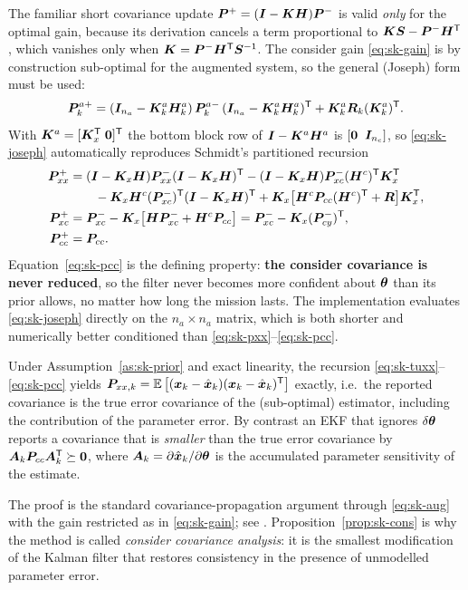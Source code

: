 \begin{remark}\label{rem:sk-joseph}
The familiar short covariance update $\bm{P}^+=(\bm{I}-\bm{K}\bm{H})\bm{P}^-$ is valid \emph{only} for the
optimal gain, because its derivation cancels a term proportional to
$\bm{K}\bm{S} - \bm{P}^-\bm{H}^{\mathsf{T}}$, which vanishes only when $\bm{K}=\bm{P}^-\bm{H}^{\mathsf{T}}\bm{S}^{-1}$.  The consider gain
\eqref{eq:sk-gain} is by construction sub-optimal for the augmented system, so the general
(Joseph) form \cite{bucyjoseph1968} must be used:
\begin{equation}
\bm{P}^{a+}_k = (\bm{I}_{n_a}-\bm{K}^a_k\bm{H}^a_k)\,\bm{P}^{a-}_k\,(\bm{I}_{n_a}-\bm{K}^a_k\bm{H}^a_k)^{\mathsf{T}}
            + \bm{K}^a_k\bm{R}_k(\bm{K}^a_k)^{\mathsf{T}} .
\label{eq:sk-joseph}
\end{equation}
With $\bm{K}^a=[\bm{K}_x^{\mathsf{T}}\;\bm 0]^{\mathsf{T}}$ the bottom block row of $\bm{I}-\bm{K}^a\bm{H}^a$ is
$[\bm 0\;\;\bm{I}_{n_c}]$, so \eqref{eq:sk-joseph} automatically reproduces Schmidt's
partitioned recursion
\begin{align}
\bm{P}^+_{xx} &= (\bm{I}-\bm{K}_x\bm{H})\bm{P}^-_{xx}(\bm{I}-\bm{K}_x\bm{H})^{\mathsf{T}}
   - (\bm{I}-\bm{K}_x\bm{H})\bm{P}^-_{xc}(\bm{H}^c)^{\mathsf{T}}\bm{K}_x^{\mathsf{T}} \nonumber\\
   &\qquad - \bm{K}_x\bm{H}^c(\bm{P}^-_{xc})^{\mathsf{T}}(\bm{I}-\bm{K}_x\bm{H})^{\mathsf{T}}
   + \bm{K}_x\!\left[\bm{H}^c\bm{P}_{cc}(\bm{H}^c)^{\mathsf{T}}+\bm{R}\right]\!\bm{K}_x^{\mathsf{T}}, \label{eq:sk-pxx}\\
\bm{P}^+_{xc} &= \bm{P}^-_{xc} - \bm{K}_x\!\left[\bm{H}\bm{P}^-_{xc} + \bm{H}^c\bm{P}_{cc}\right]
            = \bm{P}^-_{xc} - \bm{K}_x (\bm{P}^-_{cy})^{\mathsf{T}}, \label{eq:sk-pxc}\\
\bm{P}^+_{cc} &= \bm{P}_{cc}. \label{eq:sk-pcc}
\end{align}
Equation~\eqref{eq:sk-pcc} is the defining property: \textbf{the consider covariance is never
reduced}, so the filter never becomes more confident about $\bm{\theta}$ than its prior allows, no
matter how long the mission lasts.  The implementation evaluates \eqref{eq:sk-joseph} directly on
the $n_a\times n_a$ matrix, which is both shorter and numerically better conditioned than
\eqref{eq:sk-pxx}--\eqref{eq:sk-pcc}.
\end{remark}

\begin{proposition}[Consistency]\label{prop:sk-cons}
Under Assumption~\ref{as:sk-prior} and exact linearity, the recursion
\eqref{eq:sk-tuxx}--\eqref{eq:sk-pcc} yields
$\bm{P}_{xx,k} = \mathbb{E}\left[(\bm{x}_k-\hat{\bm{x}}_k)(\bm{x}_k-\hat{\bm{x}}_k)^{\mathsf{T}}\right]$ exactly, i.e.\ the reported covariance is the
true error covariance of the (sub-optimal) estimator, including the contribution of the parameter
error.  By contrast an EKF that ignores $\delta\bm{\theta}$ reports a covariance that is
\emph{smaller} than the true error covariance by
$\bm{A}_k\bm{P}_{cc}\bm{A}_k^{\mathsf{T}} \succeq \bm 0$, where $\bm{A}_k=\partial\hat{\bm{x}}_k/\partial\bm{\theta}$ is the
accumulated parameter sensitivity of the estimate.
\end{proposition}
\noindent The proof is the standard covariance-propagation argument through
\eqref{eq:sk-aug} with the gain restricted as in \eqref{eq:sk-gain}; see
\cite[\S6.5]{tapley2004}.  Proposition~\ref{prop:sk-cons} is why the method is called
\emph{consider covariance analysis}: it is the smallest modification of the Kalman filter that
restores consistency in the presence of unmodelled parameter error.

